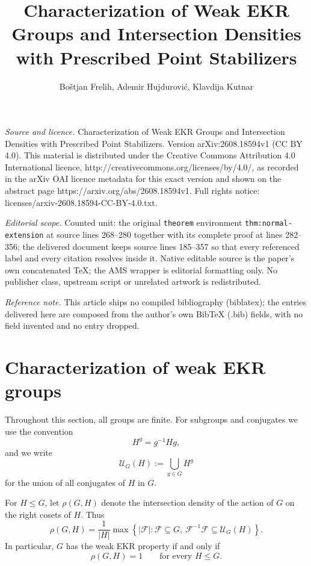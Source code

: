 \documentclass[10pt,a4paper]{amsart}
\begin{document}
\title[Characterization of Weak EKR Groups and Intersection Densiti]{Characterization of Weak EKR Groups and Intersection Densities with Prescribed Point Stabilizers}
\author{Boštjan Frelih, Ademir Hujdurović, Klavdija Kutnar}
\date{}
\maketitle
\noindent\emph{Source and licence.} Characterization of Weak EKR Groups and Intersection Densities with Prescribed Point Stabilizers. Version arXiv:2608.18594v1 (CC BY 4.0). This material is distributed under the Creative Commons Attribution 4.0 International licence, http://creativecommons.org/licenses/by/4.0/, as recorded in the arXiv OAI licence metadata for this exact version and shown on the abstract page https://arxiv.org/abs/2608.18594v1. Full rights notice: licenses/arxiv-2608.18594-CC-BY-4.0.txt.\par\smallskip
\noindent\textit{Editorial scope.} Counted unit: the original \texttt{theorem} environment \texttt{thm:normal-extension} at source lines 268--280 together with its complete proof at lines 282--356; the delivered document keeps source lines 185--357 so that every referenced label and every citation resolves inside it. Native editable source is the paper's own concatenated TeX; the AMS wrapper is editorial formatting only. No publisher class, upstream script or unrelated artwork is redistributed.
\par\smallskip\noindent\textit{Reference note.} This article ships no compiled bibliography (biblatex); the entries delivered here are composed from the author's own BibTeX (.bib) fields, with no field invented and no entry dropped.
\section{Characterization of weak EKR groups}



Throughout this section, all groups are finite. For subgroups and
conjugates we use the convention
\[
H^g=g^{-1}Hg,
\]
and we write
\[
\mathcal{U}_G(H):=\bigcup_{g\in G}H^g
\]
for the union of all conjugates of \(H\) in \(G\).

For \(H\leq G\), let \(\rho(G,H)\) denote the intersection density of
the action of \(G\) on the right cosets of \(H\). Thus
\[
\rho(G,H)
 =
 \frac{1}{|H|}
 \max\left\{
 |\mathcal{F}|:
 \mathcal{F}\subseteq G,\ 
 \mathcal{F}^{-1}\mathcal{F}\subseteq \mathcal{U}_G (H)
 \right\}.
\]
In particular, \(G\) has the weak EKR property if and only if
\[
\rho(G,H)=1
\qquad\text{for every }H\leq G.
\]
\end{document}
